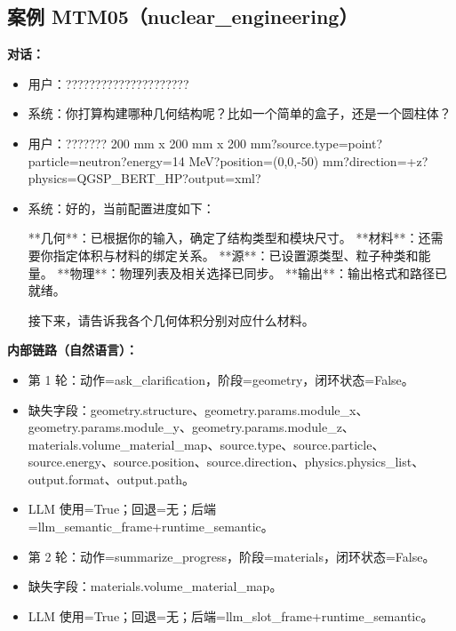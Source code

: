 \documentclass[11pt]{ctexart}
\begin{document}
\subsection{案例 MTM05（nuclear\_engineering）}
\textbf{对话：}
\begin{itemize}
\item 用户：?????????????????????
\item 系统：你打算构建哪种几何结构呢？比如一个简单的盒子，还是一个圆柱体？
\item 用户：??????? 200 mm x 200 mm x 200 mm?source.type=point?particle=neutron?energy=14 MeV?position=(0,0,-50) mm?direction=+z?physics=QGSP\_BERT\_HP?output=xml?
\item 系统：好的，当前配置进度如下：

**几何**：已根据你的输入，确定了结构类型和模块尺寸。
**材料**：还需要你指定体积与材料的绑定关系。
**源**：已设置源类型、粒子种类和能量。
**物理**：物理列表及相关选择已同步。
**输出**：输出格式和路径已就绪。

接下来，请告诉我各个几何体积分别对应什么材料。
\end{itemize}
\textbf{内部链路（自然语言）：}
\begin{itemize}
\item 第 1 轮：动作=ask\_clarification，阶段=geometry，闭环状态=False。
\item 缺失字段：geometry.structure、geometry.params.module\_x、geometry.params.module\_y、geometry.params.module\_z、materials.volume\_material\_map、source.type、source.particle、source.energy、source.position、source.direction、physics.physics\_list、output.format、output.path。
\item LLM 使用=True；回退=无；后端=llm\_semantic\_frame+runtime\_semantic。
\item 第 2 轮：动作=summarize\_progress，阶段=materials，闭环状态=False。
\item 缺失字段：materials.volume\_material\_map。
\item LLM 使用=True；回退=无；后端=llm\_slot\_frame+runtime\_semantic。
\end{itemize}
\end{document}
